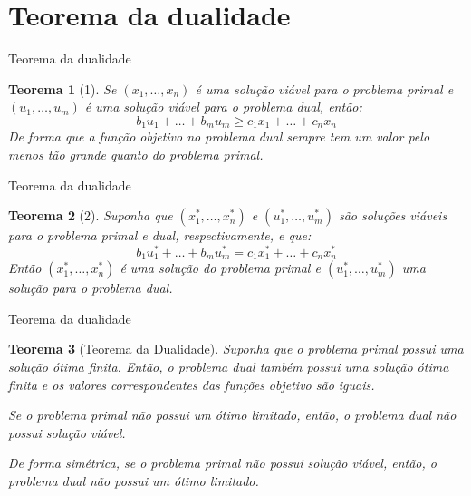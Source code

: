 \documentclass[10pt]{beamer}
\newtheorem{teo}{Teorema}
\begin{document}
\section{Teorema da dualidade}
\begin{frame}{Teorema da dualidade}
    \begin{teo}[1]
        Se $(x_1, \dots, x_n)$ é uma solução viável para o problema primal e $(u_1, \dots, u_m)$ é uma solução viável para o problema dual, então:
        \begin{equation}
            b_1 u_1 + \dots + b_m u_m \geq c_1 x_1 + \dots + c_n x_n
        \end{equation}
        De forma que a função objetivo no problema dual sempre tem um valor pelo menos tão grande quanto do problema primal.
    \end{teo}
\end{frame}

\begin{frame}{Teorema da dualidade}
    \begin{teo}[2]
        Suponha que $(x_1^*, \dots, x_n^*)$ e $(u_1^*, \dots, u_m^*)$ são soluções viáveis para o problema primal e dual, respectivamente, e que:
        \begin{equation}
            b_1 u_1^* + \dots + b_m u_m^* = c_1 x_1^* + \dots + c_n x_n^*
        \end{equation}
        Então $(x_1^*, \dots, x_n^*)$ é uma solução do problema primal e $(u_1^*, \dots, u_m^*)$ uma solução para o problema dual.
    \end{teo}
\end{frame}

\begin{frame}{Teorema da dualidade}
    \begin{teo}[Teorema da Dualidade]
        Suponha que o problema primal possui uma solução ótima finita. Então, o problema dual também possui uma solução ótima finita e os valores correspondentes das funções objetivo são iguais.
        
        \bigskip
        Se o problema primal não possui um ótimo limitado, então, o problema dual não possui solução viável.
        
        \bigskip
        De forma simétrica, se o problema primal não possui solução viável, então, o problema dual não possui um ótimo limitado.
    \end{teo}
\end{frame}
\end{document}
